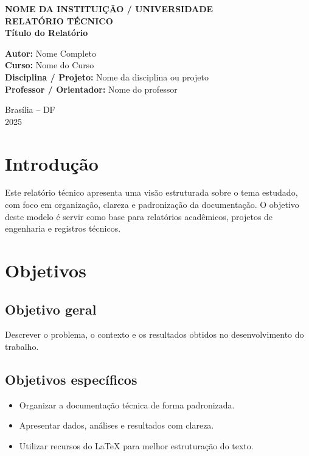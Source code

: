 \documentclass[12pt,a4paper]{report}
\begin{document}
\begin{titlepage}
\centering
\vspace*{2cm}

{\Large \textbf{NOME DA INSTITUIÇÃO / UNIVERSIDADE}}\\[1.5cm]

{\LARGE \textbf{RELATÓRIO TÉCNICO}}\\[0.7cm]
{\large \textbf{Título do Relatório}}\\[2.0cm]

\begin{flushleft}
\textbf{Autor:} Nome Completo\\
\textbf{Curso:} Nome do Curso\\
\textbf{Disciplina / Projeto:} Nome da disciplina ou projeto\\
\textbf{Professor / Orientador:} Nome do professor\\
\end{flushleft}

\vfill
Brasília -- DF\\
2025
\end{titlepage}

\tableofcontents
\listoffigures
\listoftables

\clearpage
{}

\chapter{Introdução}
Este relatório técnico apresenta uma visão estruturada sobre o tema estudado, com foco em organização, clareza e padronização da documentação. O objetivo deste modelo é servir como base para relatórios acadêmicos, projetos de engenharia e registros técnicos.

\chapter{Objetivos}
\section{Objetivo geral}
Descrever o problema, o contexto e os resultados obtidos no desenvolvimento do trabalho.

\section{Objetivos específicos}
\begin{itemize}
    \item Organizar a documentação técnica de forma padronizada.
    \item Apresentar dados, análises e resultados com clareza.
    \item Utilizar recursos do \LaTeX{} para melhor estruturação do texto.
\end{itemize}
\end{document}
